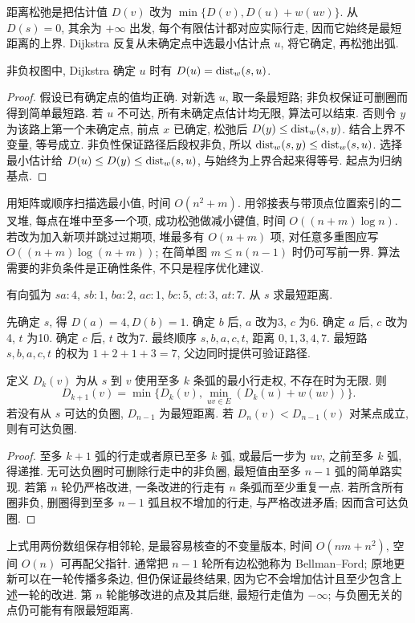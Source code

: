 距离松弛是把估计值 $D(v)$ 改为 $\min\{D(v),D(u)+w(uv)\}$. 从 $D(s)=0$, 其余为 $+\infty$ 出发, 每个有限估计都对应实际行走, 因而它始终是最短距离的上界. Dijkstra 反复从未确定点中选最小估计点 $u$, 将它确定, 再松弛出弧.
\begin{theorem}\label{thm:dijkstra}
非负权图中, Dijkstra 确定 $u$ 时有 $D(u)=\operatorname{dist}_w(s,u)$.
\end{theorem}
\begin{proof}
假设已有确定点的值均正确. 对新选 $u$, 取一条最短路; 非负权保证可删圈而得到简单最短路. 若 $u$ 不可达, 所有未确定点估计均无限, 算法可以结束. 否则令 $y$ 为该路上第一个未确定点, 前点 $x$ 已确定, 松弛后 $D(y)\le\operatorname{dist}_w(s,y)$. 结合上界不变量, 等号成立. 非负性保证路径后段权非负, 所以 $\operatorname{dist}_w(s,y)\le\operatorname{dist}_w(s,u)$. 选择最小估计给 $D(u)\le D(y)\le\operatorname{dist}_w(s,u)$, 与始终为上界合起来得等号. 起点为归纳基点.
\end{proof}
用矩阵或顺序扫描选最小值, 时间 $O(n^2+m)$. 用邻接表与带顶点位置索引的二叉堆, 每点在堆中至多一个项, 成功松弛做减小键值, 时间 $O((n+m)\log n)$. 若改为加入新项并跳过过期项, 堆最多有 $O(n+m)$ 项, 对任意多重图应写 $O((n+m)\log(n+m))$; 在简单图 $m\le n(n-1)$ 时仍可写前一界. 算法需要的非负条件是正确性条件, 不只是程序优化建议.
\begin{example}
有向弧为 $sa:4$, $sb:1$, $ba:2$, $ac:1$, $bc:5$, $ct:3$, $at:7$. 从 $s$ 求最短距离.
\end{example}
\begin{solution}
先确定 $s$, 得 $D(a)=4,D(b)=1$. 确定 $b$ 后, $a$ 改为3, $c$ 为6. 确定 $a$ 后, $c$ 改为4, $t$ 为10. 确定 $c$ 后, $t$ 改为7. 最终顺序 $s,b,a,c,t$, 距离 $0,1,3,4,7$. 最短路 $s,b,a,c,t$ 的权为 $1+2+1+3=7$, 父边同时提供可验证路径.
\end{solution}
\begin{theorem}\label{thm:bellmanford}
定义 $D_k(v)$ 为从 $s$ 到 $v$ 使用至多 $k$ 条弧的最小行走权, 不存在时为无限. 则
\[
D_{k+1}(v)=\min\bigl\{D_k(v),\min_{uv\in E}(D_k(u)+w(uv))\bigr\}.
\]
若没有从 $s$ 可达的负圈, $D_{n-1}$ 为最短距离. 若 $D_n(v)<D_{n-1}(v)$ 对某点成立, 则有可达负圈.
\end{theorem}
\begin{proof}
至多 $k+1$ 弧的行走或者原已至多 $k$ 弧, 或最后一步为 $uv$, 之前至多 $k$ 弧, 得递推. 无可达负圈时可删除行走中的非负圈, 最短值由至多 $n-1$ 弧的简单路实现. 若第 $n$ 轮仍严格改进, 一条改进的行走有 $n$ 条弧而至少重复一点. 若所含所有圈非负, 删圈得到至多 $n-1$ 弧且权不增加的行走, 与严格改进矛盾; 因而含可达负圈.
\end{proof}
上式用两份数组保存相邻轮, 是最容易核查的不变量版本, 时间 $O(nm+n^2)$, 空间 $O(n)$ 可再配父指针. 通常把 $n-1$ 轮所有边松弛称为 Bellman--Ford; 原地更新可以在一轮传播多条边, 但仍保证最终结果, 因为它不会增加估计且至少包含上述一轮的改进. 第 $n$ 轮能够改进的点及其后继, 最短行走值为 $-\infty$; 与负圈无关的点仍可能有有限最短距离.
